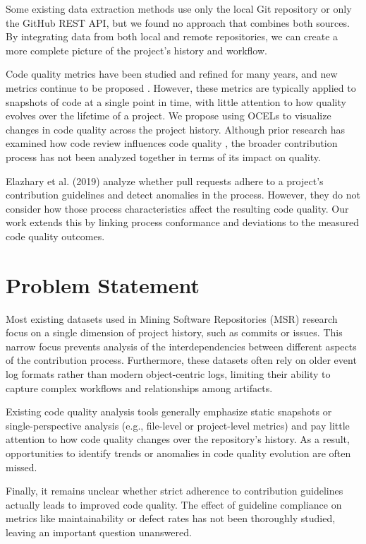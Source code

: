 Some existing data extraction methods use only the local Git repository or only the GitHub REST API, but we found no approach that combines both sources. By integrating data from both local and remote repositories, we can create a more complete picture of the project’s history and workflow.

Code quality metrics have been studied and refined for many years, and new metrics continue to be proposed \autocite{DBLP:journals/smr/CodabuxSC24}. However, these metrics are typically applied to snapshots of code at a single point in time, with little attention to how quality evolves over the lifetime of a project. We propose using OCELs to visualize changes in code quality across the project history. Although prior research has examined how code review influences code quality \autocite{DBLP:journals/ese/McIntoshKAH16}, the broader contribution process has not been analyzed together in terms of its impact on quality.

Elazhary et al. (2019) \autocite{DBLP:conf/icsm/ElazharySEZ19} analyze whether pull requests adhere to a project’s contribution guidelines and detect anomalies in the process. However, they do not consider how those process characteristics affect the resulting code quality. Our work extends this by linking process conformance and deviations to the measured code quality outcomes.

\section{Problem Statement}
Most existing datasets used in Mining Software Repositories (MSR) research focus on a single dimension of project history, such as commits or issues. This narrow focus prevents analysis of the interdependencies between different aspects of the contribution process. Furthermore, these datasets often rely on older event log formats rather than modern object-centric logs, limiting their ability to capture complex workflows and relationships among artifacts.

Existing code quality analysis tools generally emphasize static snapshots or single-perspective analysis (e.g., file-level or project-level metrics) and pay little attention to how code quality changes over the repository’s history. As a result, opportunities to identify trends or anomalies in code quality evolution are often missed.

Finally, it remains unclear whether strict adherence to contribution guidelines actually leads to improved code quality. The effect of guideline compliance on metrics like maintainability or defect rates has not been thoroughly studied, leaving an important question unanswered.

